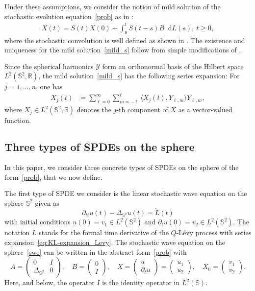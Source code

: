 \documentclass[11pt]{amsart}
\newcommand{\R}{{\mathbb R}}
\newcommand{\IS}{\mathbb{S}}
\newcommand*\dd{\mathop{}\!\mathrm{d}}
\newcommand{\Deltalb}{\Delta_{\IS^2}}
\begin{document}
Under these assumptions, we consider 
the notion of mild solution of the stochastic evolution equation~\eqref{prob} as in \cite{peszat2007}: 
\begin{align}\label{mild_s}
X(t)=S(t)X(0)+\int_0^tS({t-s})B\dd L(s),\ t\geq0,
\end{align}
where the stochastic convolution is well defined as shown in \cite{peszat2007}. The existence and uniqueness for the mild solution~\eqref{mild_s} follow from simple modifications of \cite{MR4077824,MR4462619,papi2025}.

Since the spherical harmonics $\mathcal Y$ form an orthonormal basis of the Hilbert space $L^2(\IS^2,\R)$, the mild solution~\eqref{mild_s} has the following series expansion: For $j=1,\ldots,n$, one has 
\begin{align}\label{mildsol}
X_j(t)&=\sum_{\ell=0}^\infty\sum_{m=-\ell}^\ell\langle X_j(t),Y_{\ell,m} \rangle Y_{\ell,m},
\end{align}
where $X_j\in L^2({\IS^{2}}, \R)$ denotes the $j$-th component of $X$ as a vector-valued function.

\subsection{Three types of SPDEs on the sphere}
In this paper, we consider three concrete types of SPDEs on the sphere of the form~\eqref{prob}, that we now define. 

The first type of SPDE we consider is the linear stochastic wave equation on the sphere $\IS^2$ given as
\begin{equation}\label{swe}
\partial_{tt}u(t)-\Deltalb u(t)=\dot{L}(t)
\end{equation}
with initial conditions $u(0)=v_1\in L^2(\IS^2)$ and $\partial_{t}u(0)=v_2\in L^2(\IS^2)$.
The notation $\dot{L}$ stands for the formal time derivative of the $Q$-L\'evy process with series expansion~\eqref{eq:KL-expansion_Levy}. The stochastic wave equation on the sphere~\eqref{swe} can be written in the abstract
form~\eqref{prob} with
\begin{equation*}
 A=\begin{pmatrix}0 & I \\ \Deltalb & 0 \end{pmatrix},
 \quad B=\begin{pmatrix}0\\I \end{pmatrix},
 \quad X=\begin{pmatrix} u\\ \partial_tu\end{pmatrix}=\begin{pmatrix} u_1\\u_2\end{pmatrix},
 \quad X_0=\begin{pmatrix} v_1\\v_2\end{pmatrix}.
\end{equation*}
Here, and below, the operator $I$ is the identity operator in $L^2(\IS)$.
\end{document}
